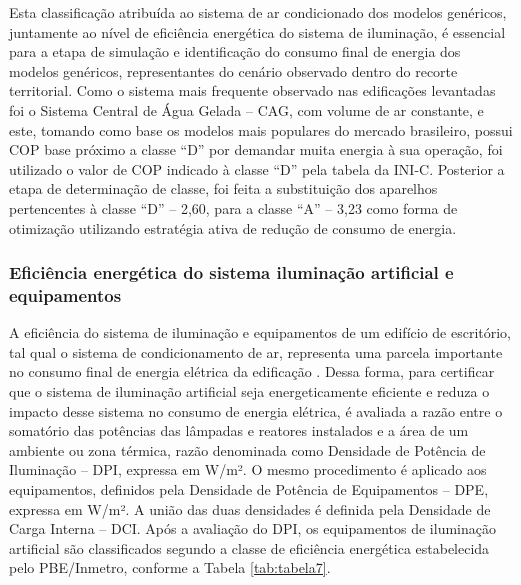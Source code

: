 \noindent Esta classificação atribuída ao sistema de ar condicionado dos modelos genéricos, juntamente 
ao nível de eficiência energética do sistema de iluminação, é essencial para a etapa de 
simulação e identificação do consumo final de energia dos modelos genéricos, representantes 
do cenário observado dentro do recorte territorial.\vspace*{0.3cm} \newline
Como o sistema mais frequente observado nas edificações levantadas foi o Sistema Central 
de Água Gelada – CAG, com volume de ar constante, e este, tomando como base os modelos mais 
populares do mercado brasileiro, possui COP base próximo a classe “D” por demandar muita 
energia à sua operação, foi utilizado o valor de COP indicado à classe “D” pela tabela da 
INI-C. Posterior a etapa de determinação de classe, foi feita a substituição dos aparelhos 
pertencentes à classe “D” – 2,60, para a classe “A” – 3,23 como forma de otimização 
utilizando estratégia ativa de redução de consumo de energia.
\subsubsection{Eficiência energética do sistema iluminação artificial e equipamentos}
A eficiência do sistema de iluminação e equipamentos de um edifício de escritório, tal 
qual o sistema de condicionamento de ar, representa uma parcela importante no consumo 
final de energia elétrica da edificação \cite{AmericanSocietyofHeatingRefrigeratingandAir-ConditioningEngineers-ASHRAE2019,ConselhoBrasileirodeConstrucaoSustentavel-CBCS2015}.\vspace*{0.3cm} \newline
Dessa forma, para certificar que o sistema de iluminação artificial seja energeticamente 
eficiente e reduza o impacto desse sistema no consumo de energia elétrica, é avaliada a 
razão entre o somatório das potências das lâmpadas e reatores instalados e a área de um 
ambiente ou zona térmica, razão denominada como Densidade de Potência de Iluminação – DPI, 
expressa em W/m². O mesmo procedimento é aplicado aos equipamentos, definidos pela Densidade 
de Potência de Equipamentos – DPE, expressa em W/m². A união das duas densidades é definida 
pela Densidade de Carga Interna – DCI.\vspace*{0.3cm} \newline
Após a avaliação do DPI, os equipamentos de iluminação artificial são classificados 
segundo a classe de eficiência energética estabelecida pelo PBE/Inmetro, conforme a Tabela \ref{tab:tabela7}.

